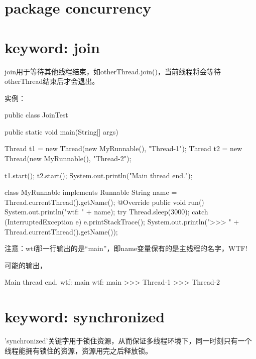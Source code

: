 \documentclass[a4paper,11pt]{article}
\begin{document}
\section[package: concurrency]{package concurrency}

\section[keyword: join]{keyword: join}
join用于等待其他线程结束，如otherThread.join()，当前线程将会等待
otherThread结束后才会退出。

实例：

\begin{javacode}
public class JoinTest {
  public static void main(String[] args) {
    Thread t1 = new Thread(new MyRunnable(), "Thread-1");
    Thread t2 = new Thread(new MyRunnable(), "Thread-2");
    
    t1.start();
    t2.start();
    System.out.println("Main thread end.");
  }
}

class MyRunnable implements Runnable {
  String name = Thread.currentThread().getName();
  @Override
  public void run() {
    System.out.println("wtf: " + name);
    try {
      Thread.sleep(3000);
    } catch (InterruptedException e) {
      e.printStackTrace();
    }
    System.out.println(">>> " + Thread.currentThread().getName());
  }
}
\end{javacode}

注意：wtf那一行输出的是“main”，即name变量保有的是主线程的名字，WTF!

可能的输出，

\begin{bashcode}
Main thread end.
wtf: main
wtf: main
>>> Thread-1
>>> Thread-2
\end{bashcode}

\section[keyword: synchronized]{keyword: synchronized}
'synchronized'关键字用于锁住资源，从而保证多线程环境下，同一时刻只有一个
线程能拥有锁住的资源，资源用完之后释放锁。
\end{document}
